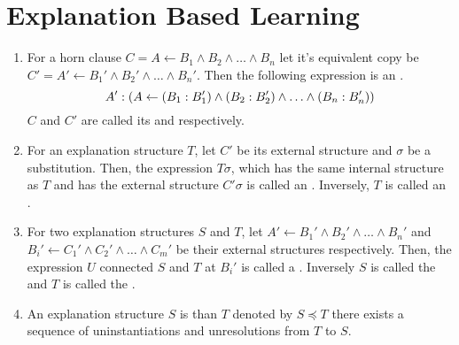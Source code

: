 \section{Explanation Based Learning}

\begin{defi}
\begin{enumerate}
 \item For a horn clause $C=A\leftarrow B_1\wedge B_2\wedge\ldots\wedge B_n$ let it's equivalent copy be $C'=A'\leftarrow B_1'\wedge B_2'\wedge\ldots\wedge B_n'$. Then the following expression is an .
 \begin{equation}
  A':\left( A\leftarrow \left( B_1:B_1'\right)\wedge\left( B_2:B_2'\right)\wedge\ldots\wedge\left( B_n:B_n'\right)\right)
 \end{equation}
 $C$ and $C'$ are called its  and  respectively.
 \item For an explanation structure $T$, let $C'$ be its external structure and $\sigma$ be a substitution. Then, the expression $T\sigma$, which has the same internal structure as $T$ and has
the external structure $C'\sigma$ is called an . Inversely, $T$ is called an .
 \item For two explanation structures $S$ and $T$, let $A'\leftarrow B_1'\wedge B_2'\wedge\ldots\wedge B_n'$ and $B_i'\leftarrow C_1'\wedge C_2'\wedge\ldots\wedge C_m'$ be their external structures respectively. Then, the expression $U$ connected $S$ and $T$ at $B_i'$ is called a . Inversely $S$ is called the  and $T$ is called the .
 \item An explanation structure $S$ is  than $T$ denoted by $S\preceq T$ \iffTx{} there exists a sequence of uninstantiations and unresolutions from $T$ to $S$.
\end{enumerate}
\cite{conf/ijcai/YamamuraK91}
\end{defi}

